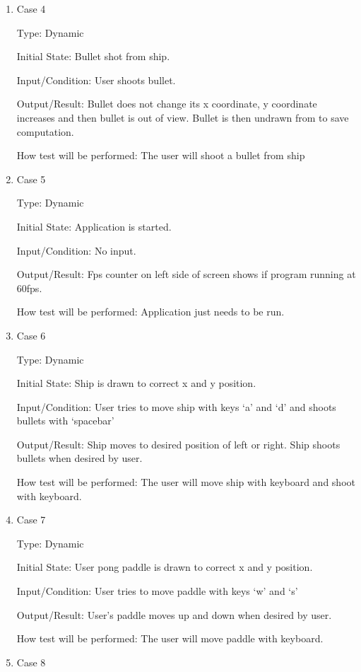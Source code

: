 \documentclass[12pt, titlepage]{article}
\begin{document}
\begin{enumerate}
\item{Case 4\\}

Type: Dynamic

Initial State: Bullet shot from ship.

Input/Condition: User shoots bullet.

Output/Result: Bullet does not change its x coordinate, y coordinate increases and then bullet is out of view. Bullet is then undrawn from to save computation.

How test will be performed: The user will shoot a bullet from ship

\item{Case 5\\}

Type: Dynamic

Initial State: Application is started.

Input/Condition: No input.

Output/Result: Fps counter on left side of screen shows if program running at 60fps.

How test will be performed: Application just needs to be run.

\item{Case 6\\}

Type: Dynamic

Initial State: Ship is drawn to correct x and y position.

Input/Condition: User tries to move ship with keys ‘a’ and ‘d’ and shoots bullets with ‘spacebar’

Output/Result: Ship moves to desired position of left or right. Ship shoots bullets when desired by user. 

How test will be performed: The user will move ship with keyboard and shoot with keyboard.

\item{Case 7\\}

Type: Dynamic

Initial State: User pong paddle is drawn to correct x and y position.

Input/Condition: User tries to move paddle with keys ‘w’ and ‘s’ 

Output/Result: User’s paddle moves up and down when desired by user.

How test will be performed: The user will move paddle with keyboard.

\item{Case 8\\}


\end{enumerate}
\end{document}
